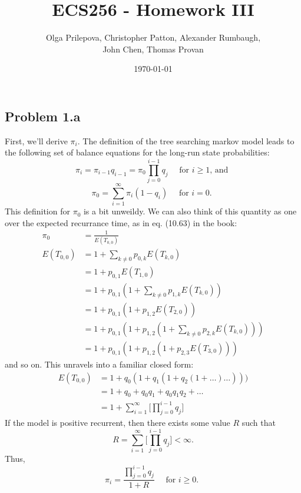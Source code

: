 \documentclass[letter]{article}
\author{Olga Prilepova, Christopher Patton, Alexander Rumbaugh, \\ John Chen, Thomas Provan}
\date{\today}
\title{ECS256 - Homework III}
\begin{document}
\maketitle

\subsection*{Problem 1.a}
First, we'll derive $\pi_i$. The definition of the tree searching markov model leads to the 
following set of balance equations for the long-run state probabilities: 
$$ \pi_i = \pi_{i-1}q_{i-1} = \pi_0 \prod_{j=0}^{i-1}{q_j} \quad \text{ for $i\ge 1$, and } $$
$$ \pi_0 = \sum_{i=1}^\infty{\pi_i(1-q_i)} \quad \text{ for $i=0$. } $$ 
This definition for $\pi_0$ is a bit unweildy. We can also think of this quantity as one 
over the expected recurrance time, as in eq. (10.63) in the book: 
\begin{equation*}
  \begin{aligned}
         \pi_0 &= \frac{1}{E(T_{0,0})} \\ 
    E(T_{0,0}) &= 1 + \sum_{k \ne 0}{p_{0,k}E(T_{k,0})} \\ 
               &= 1 + p_{0,1}E(T_{1,0}) \\
               &= 1 + p_{0,1}(1 + \sum_{k \ne 0}{p_{1,k}E(T_{k,0})}) \\ 
               &= 1 + p_{0,1}(1 + p_{1,2}E(T_{2,0})) \\
               &= 1 + p_{0,1}(1 + p_{1,2}(1 + \sum_{k \ne 0}{p_{2,k}E(T_{k,0})})) \\
               &= 1 + p_{0,1}(1 + p_{1,2}(1 + p_{2,3}E(T_{3,0}))) 
  \end{aligned}
\end{equation*}
and so on. This unravels into a familiar closed form:   
\begin{equation*}
  \begin{aligned}
      E(T_{0,0}) &= 1 + q_0(1 + q_1(1 + q_2(1 + \dots ) \dots ))) \\ 
                 &= 1 + q_0 + q_0q_1 + q_0q_1q_2 + \dots \\
                 &= 1 + \sum_{i=1}^\infty{\big[\prod_{j=0}^{i-1}{q_j}\big]}
  \end{aligned}
\end{equation*}
If the model is positive recurrent, then there exists some value $R$ such that
$$ R = \sum_{i=1}^\infty{\big[\prod_{j=0}^{i-1}{q_j}\big]} < \infty. $$
Thus, 
$$ \pi_i = \frac{\prod_{j=0}^{i-1}{q_j}}{1 + R} \quad \text{ for $i \ge 0$. } $$
\end{document}
